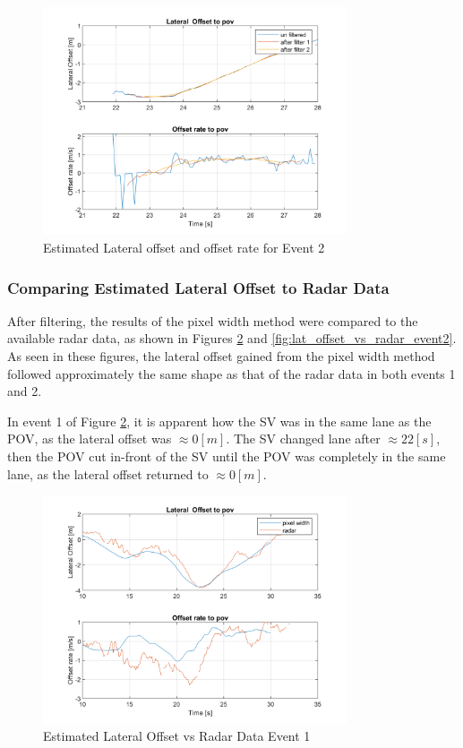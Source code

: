\begin{figure}[H]
    \centering
    \includegraphics[width=0.8\textwidth]{FiguresMat/filter_compare_lateral_116147345.png}
    \caption{Estimated Lateral offset and offset rate for Event 2}
    \label{fig:lat_offset_event2}
\end{figure}


\subsubsection{Comparing Estimated Lateral Offset to Radar Data}

After filtering, the results of the pixel width method were compared to the available radar data, as shown in Figures \ref{fig:lat_offset_vs_radar_event1} and \ref{fig:lat_offset_vs_radar_event2}. As seen in these figures, the lateral offset gained from the pixel width method followed approximately the same shape as that of the radar data in both events 1 and 2. 

In event 1 of Figure \ref{fig:lat_offset_vs_radar_event1}, it is apparent how the SV was in the same lane as the POV, as the lateral offset was $\approx 0[m]$. The SV changed lane after $\approx 22[s]$, then the POV cut in-front of the SV until the POV was completely in the same lane, as the lateral offset returned to $\approx 0[m]$. 

\begin{figure}[H]
    \centering
    \includegraphics[width=0.8\textwidth]{FiguresMat/radar_compare_lateral_10794257.png}
    \caption{Estimated Lateral Offset vs Radar Data Event 1}
    \label{fig:lat_offset_vs_radar_event1}
\end{figure}

